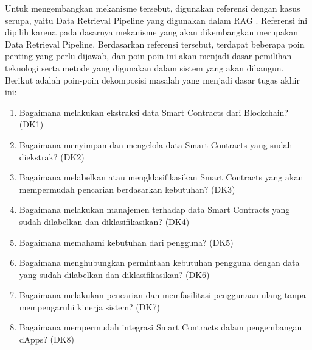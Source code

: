 
Untuk mengembangkan mekanisme tersebut, digunakan referensi dengan kasus serupa, yaitu Data Retrieval Pipeline yang digunakan dalam RAG \parencite{CrateDB_RAG_Pipelines}. Referensi ini dipilih karena pada dasarnya mekanisme yang akan dikembangkan merupakan Data Retrieval Pipeline. Berdasarkan referensi tersebut, terdapat beberapa poin penting yang perlu dijawab, dan poin-poin ini akan menjadi dasar pemilihan teknologi serta metode yang digunakan dalam sistem yang akan dibangun. Berikut adalah poin-poin dekomposisi masalah yang menjadi dasar tugas akhir ini:

\begin{enumerate}
	\item Bagaimana melakukan ekstraksi data Smart Contracts dari Blockchain? (DK1)
	\item Bagaimana menyimpan dan mengelola data Smart Contracts yang sudah diekstrak? (DK2)
	\item Bagaimana melabelkan atau mengklasifikasikan Smart Contracts yang akan mempermudah pencarian berdasarkan kebutuhan? (DK3)
	\item Bagaimana melakukan manajemen terhadap data Smart Contracts yang sudah dilabelkan dan diklasifikasikan? (DK4)
	\item Bagaimana memahami kebutuhan dari pengguna? (DK5)
	\item Bagaimana menghubungkan permintaan kebutuhan pengguna dengan data yang sudah dilabelkan dan diklasifikasikan? (DK6)
	\item Bagaimana melakukan pencarian dan memfasilitasi penggunaan ulang tanpa mempengaruhi kinerja sistem? (DK7)
	\item Bagaimana mempermudah integrasi Smart Contracts dalam pengembangan dApps? (DK8)
\end{enumerate}

